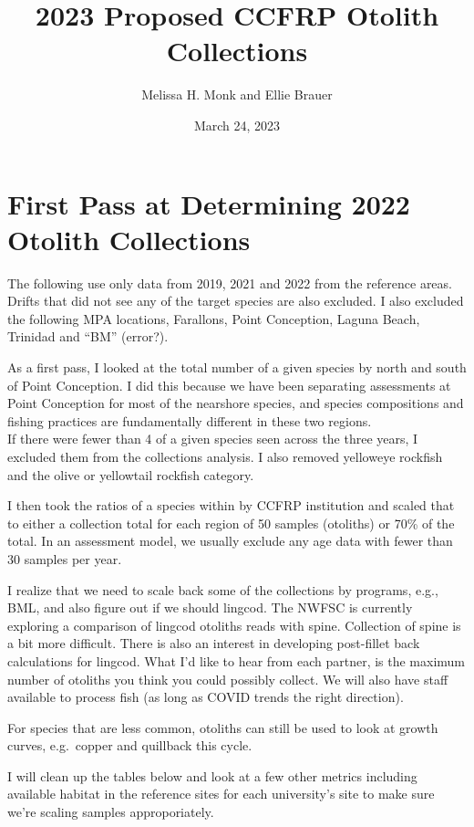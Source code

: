 \documentclass[
]{article}
\title{2023 Proposed CCFRP Otolith Collections}
\author{Melissa H. Monk and Ellie Brauer}
\date{March 24, 2023}
\begin{document}
\maketitle

\hypertarget{first-pass-at-determining-2022-otolith-collections}{%
\section{First Pass at Determining 2022 Otolith Collections}\label{first-pass-at-determining-2022-otolith-collections}}

The following use only data from 2019, 2021 and 2022 from the reference areas. Drifts that did not see any of the target species are also excluded. I also excluded the following MPA locations, Farallons, Point Conception, Laguna Beach, Trinidad and ``BM'' (error?).

As a first pass, I looked at the total number of a given species by north and south
of Point Conception. I did this because we have been separating assessments at
Point Conception for most of the nearshore species, and species compositions and
fishing practices are fundamentally different in these two regions.\\
If there were fewer than 4 of a given species seen across the three years, I
excluded them from the collections analysis. I also removed yelloweye rockfish
and the olive or yellowtail rockfish category.

I then took the ratios of a
species within by CCFRP institution and scaled that to either a collection total
for each region of 50 samples (otoliths) or 70\% of the total. In an assessment model,
we usually exclude any age data with fewer than 30 samples per year.

I realize that we need to scale back some of the collections by programs, e.g., BML,
and also figure out if we should lingcod. The NWFSC is currently exploring
a comparison of lingcod otoliths reads with spine. Collection of spine is a bit more
difficult. There is also an interest in developing post-fillet back calculations
for lingcod. What I'd like to hear from each partner, is the maximum number of
otoliths you think you could possibly collect. We will also have staff available
to process fish (as long as COVID trends the right direction).

For species that are less common, otoliths can still be used to look at growth
curves, e.g.~copper and quillback this cycle.

I will clean up the tables below and look at a few other metrics including
available habitat in the reference sites for each university's site to make sure
we're scaling samples approporiately.
\end{document}
